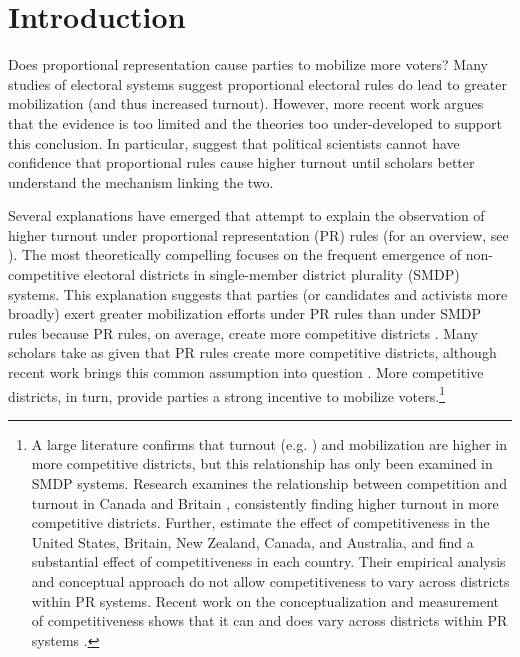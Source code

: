 \documentclass[12pt]{article}
\begin{document}
\section*{Introduction}

Does proportional representation cause parties to mobilize more voters? Many studies of electoral systems suggest proportional electoral rules do lead to greater mobilization (and thus increased turnout). However, more recent work argues that the evidence is too limited and the theories too under-developed to support this conclusion. In particular, \cite{BlaisAarts2006} suggest that political scientists cannot have confidence that proportional rules cause higher turnout until scholars better understand the mechanism linking the two. 

Several explanations have emerged that attempt to explain the observation of higher turnout under proportional representation (PR) rules (for an overview, see \citealt{BlaisAarts2006}). The most theoretically compelling focuses on the frequent emergence of non-competitive electoral districts in single-member district plurality (SMDP) systems. This explanation suggests that parties (or candidates and activists more broadly) exert greater mobilization efforts under PR rules than under SMDP rules because PR rules, on average, create more competitive districts \citep{Cox1999}. Many scholars take as given that PR rules create more competitive districts, although recent work brings this common assumption into question \citep{BlaisLago2009}. More competitive districts, in turn, provide parties a strong incentive to mobilize voters.\footnote{A large literature confirms that turnout (e.g. \citealt{RosenstoneHansen1993}) and mobilization \citep{CoxMunger1989, KarpBanducciBowler2007} are higher in more competitive districts, but this relationship has only been examined in SMDP systems. Research examines the relationship between competition and turnout in Canada \citep{MatsusakaPalda1993, Endersbyetal2002} and Britain \citep{DenverHands1974, DenverHands1985}, consistently finding higher turnout in more competitive districts. Further, \cite{KarpBanducciBowler2007} estimate the effect of competitiveness in the United States, Britain, New Zealand, Canada, and Australia, and find a substantial effect of competitiveness in each country. Their empirical analysis and conceptual approach do not allow competitiveness to vary across districts within PR systems. Recent work on the conceptualization and measurement of competitiveness shows that it can and does vary across districts within PR systems \citep{GrofmanSelb2009, Selb2009, BlaisLago2009}.} 
\end{document}
